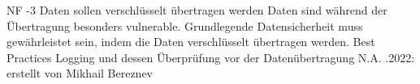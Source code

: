 \begin{myreq}
    \threeinline
    {\reqno}
    {\reqtype NF}
    {-3}
    \reqdesc Daten sollen verschlüsselt übertragen werden
    \reqrat Daten sind während der Übertragung besonders vulnerable. Grundlegende Datensicherheit muss gewährleistet sein, indem die Daten verschlüsselt übertragen werden.
    \reqorig Best Practices
    \reqfit Logging und dessen Überprüfung vor der Datenübertragung
    \twoinline
    {}
    {}
    \twoinline
    {}
    {\reqconf N.A.}
    \reqmater {}
    .2022: erstellt von Mikhail Bereznev
\end{myreq}